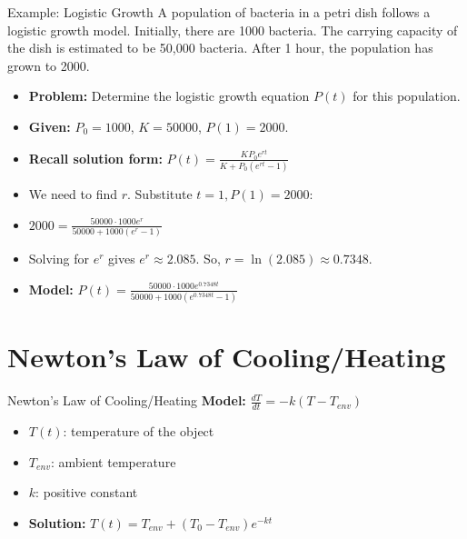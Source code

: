 \documentclass[10pt,aspectratio=169]{beamer}
\begin{document}
\begin{frame}{Example: Logistic Growth}
    A population of bacteria in a petri dish follows a logistic growth model. Initially, there are 1000 bacteria. The carrying capacity of the dish is estimated to be 50,000 bacteria. After 1 hour, the population has grown to 2000.
    \begin{itemize}
        \item \textbf{Problem:} Determine the logistic growth equation $P(t)$ for this population.
        \item \textbf{Given:} $P_0 = 1000$, $K = 50000$, $P(1) = 2000$.
        \item \textbf{Recall solution form:} $P(t) = \frac{KP_0 e^{rt}}{K + P_0 (e^{rt} - 1)}$
        \item We need to find $r$. Substitute $t=1, P(1)=2000$:
        \item $2000 = \frac{50000 \cdot 1000 e^{r}}{50000 + 1000 (e^{r} - 1)}$
        \item Solving for $e^r$ gives $e^r \approx 2.085$. So, $r = \ln(2.085) \approx 0.7348$.
        \item \textbf{Model:} $P(t) = \frac{50000 \cdot 1000 e^{0.7348t}}{50000 + 1000 (e^{0.7348t} - 1)}$
    \end{itemize}
\end{frame}

\section{Newton's Law of Cooling/Heating}
\begin{frame}{Newton's Law of Cooling/Heating}
    \textbf{Model:} $\frac{dT}{dt} = -k(T - T_{env})$
    \begin{itemize}
        \item $T(t)$: temperature of the object
        \item $T_{env}$: ambient temperature
        \item $k$: positive constant
        \item \textbf{Solution:} $T(t) = T_{env} + (T_0 - T_{env})e^{-kt}$
    \end{itemize}
\end{frame}
\end{document}
